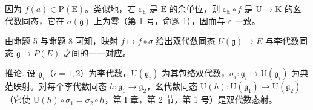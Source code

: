 因为 \(f(a) \in \mathrm{P}(\mathrm{E})\)。类似地，若 \(\varepsilon_{\mathbb{E}}\) 是 \(\mathrm{E}\) 的余单位，则 \(\varepsilon_{\mathbb{E}} \circ f\) 是 \(\mathrm{U} \to \mathrm{K}\) 的幺代数同态，它在 \(\sigma(\mathfrak{g})\) 上为零（第 1 号，命题 1），因而与 \(\varepsilon\) 一致。

由命题 5 与命题 8 可知，映射 \(f \mapsto f \circ \sigma\) 给出双代数同态 \(U(\mathfrak{g}) \to E\) 与李代数同态 \(\mathfrak{g} \to P(E)\) 之间的一一对应。

推论. 设 \(\mathfrak{g}_i\)（\(i = 1,2\)）为李代数，\(\mathrm{U}(\mathfrak{g}_i)\) 为其包络双代数，\(\sigma_i\colon \mathfrak{g}_i\to \mathrm{U}(\mathfrak{g}_i)\) 为典范映射。对每个李代数同态 \(h\colon \mathfrak{g}_1\to \mathfrak{g}_2\)，幺代数同态 \(\mathrm{U}(h)\colon \mathrm{U}(\mathfrak{g}_1)\to \mathrm{U}(\mathfrak{g}_2)\)（它使 \(\mathrm{U}(h)\circ \sigma_1 = \sigma_2\circ h\)，第 I 章，第 2 节，第 1 号）是双代数态射。

